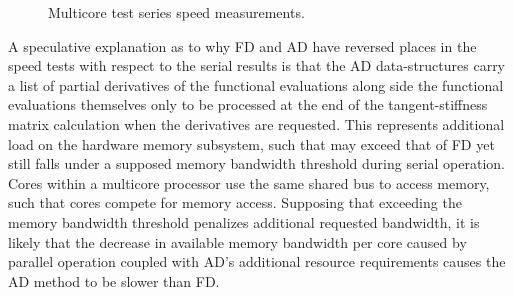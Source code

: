 \documentclass[preprint,12pt]{elsarticle}
\begin{document}
%
\begin{figure}[tbp] 
    \centering 
    \scalebox{1.1}{}
    \caption{Multicore test series speed measurements.} 
    \label{fig:multi_speed}
\end{figure}
%
A speculative explanation as to why FD and AD have reversed places in the speed tests with respect to the serial results is that the AD data-structures carry a list of partial derivatives of the functional evaluations along side the functional evaluations themselves only to be processed at the end of the tangent-stiffness matrix calculation when the derivatives are requested. This represents additional load on the hardware memory subsystem, such that may exceed that of FD yet still falls under a supposed memory bandwidth threshold during serial operation. Cores within a multicore processor use the same shared bus to access memory, such that cores compete for memory access. Supposing that exceeding the memory bandwidth threshold penalizes additional requested bandwidth, it is likely that the decrease in available memory bandwidth per core caused by parallel operation coupled with AD's additional resource requirements causes the AD method to be slower than FD. 
\end{document}
